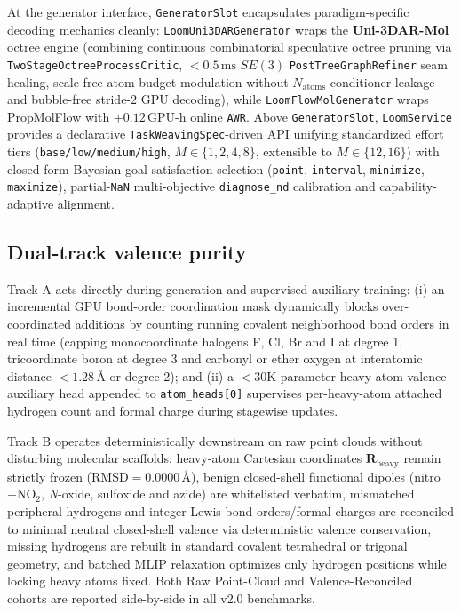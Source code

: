 \documentclass[11pt,a4paper]{article}
\begin{document}
At the generator interface, \texttt{Generator\allowbreak Slot} encapsulates paradigm-specific decoding mechanics cleanly: \texttt{Loom\allowbreak Uni3DAR\allowbreak Generator} wraps the \textbf{Uni-3DAR-Mol} octree engine\cite{chen2026uni3darmol} (combining continuous combinatorial speculative octree pruning via \texttt{TwoStage\allowbreak Octree\allowbreak Process\allowbreak Critic}, $<0.5\,\text{ms}$ $SE(3)$ \texttt{PostTree\allowbreak Graph\allowbreak Refiner} seam healing, scale-free atom-budget modulation without $N_{\text{atoms}}$ conditioner leakage and bubble-free stride-$2$ GPU decoding), while \texttt{Loom\allowbreak FlowMol\allowbreak Generator} wraps PropMolFlow\cite{zeng2026propmolflow} with $+0.12\,\text{GPU-h}$ online \texttt{AWR}. Above \texttt{Generator\allowbreak Slot}, \texttt{Loom\allowbreak Service} provides a declarative \texttt{Task\allowbreak Weaving\allowbreak Spec}-driven API unifying standardized effort tiers (\texttt{base/\allowbreak low/\allowbreak medium/\allowbreak high}, $M\in\{1,2,4,8\}$, extensible to $M\in\{12,16\}$) with closed-form Bayesian goal-satisfaction selection (\texttt{point}, \texttt{interval}, \texttt{minimize}, \texttt{maximize}), partial-\texttt{NaN} multi-objective \texttt{diagnose\_\allowbreak nd} calibration and capability-adaptive alignment.

\subsection*{Dual-track valence purity}

Track A acts directly during generation and supervised auxiliary training: (i) an incremental GPU bond-order coordination mask dynamically blocks over-coordinated additions by counting running covalent neighborhood bond orders in real time (capping monocoordinate halogens F, Cl, Br and I at degree 1, tricoordinate boron at degree 3 and carbonyl or ether oxygen at interatomic distance $<1.28\,\text{\AA}$ or degree 2); and (ii) a $<30\text{K}$-parameter heavy-atom valence auxiliary head appended to \texttt{atom\_heads[0]} supervises per-heavy-atom attached hydrogen count and formal charge during stagewise updates.

Track B operates deterministically downstream on raw point clouds without disturbing molecular scaffolds: heavy-atom Cartesian coordinates $\mathbf{R}_{\text{heavy}}$ remain strictly frozen ($\text{RMSD} = 0.0000\,\text{\AA}$), benign closed-shell functional dipoles (nitro $-\text{NO}_2$, \textit{N}-oxide, sulfoxide and azide) are whitelisted verbatim, mismatched peripheral hydrogens and integer Lewis bond orders/formal charges are reconciled to minimal neutral closed-shell valence via deterministic valence conservation, missing hydrogens are rebuilt in standard covalent tetrahedral or trigonal geometry, and batched MLIP relaxation optimizes only hydrogen positions while locking heavy atoms fixed. Both Raw Point-Cloud and Valence-Reconciled cohorts are reported side-by-side in all v2.0 benchmarks.
\end{document}
